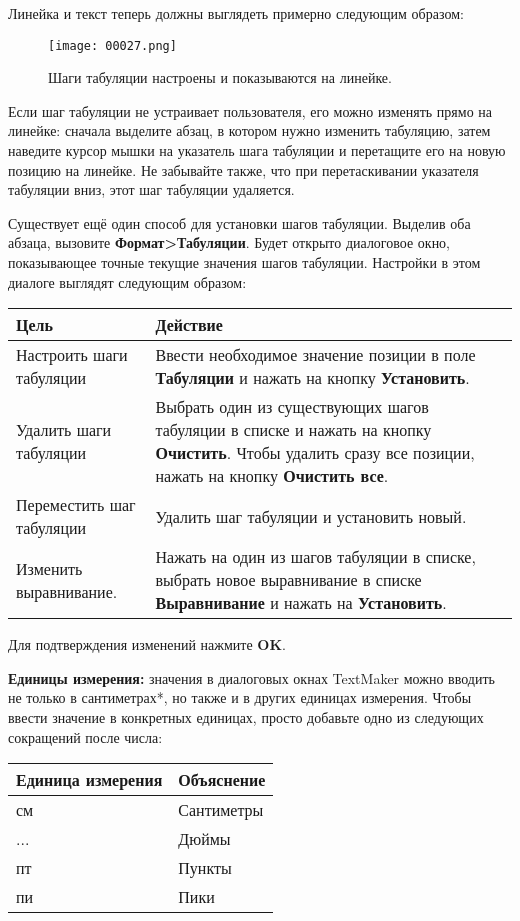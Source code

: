 \documentclass[a4paper,10pt]{article}
\begin{document}
Линейка и текст теперь должны выглядеть примерно следующим образом:

\begin{figure}[ht]
\texttt{[image: 00027.png]}
\centering
\caption{Шаги табуляции настроены и показываются на линейке.}
\end{figure}

Если шаг табуляции не устраивает пользователя, его можно изменять прямо на линейке: сначала выделите абзац, в котором нужно изменить табуляцию, затем наведите курсор мышки на указатель шага табуляции и перетащите его на новую позицию на линейке. Не забывайте также, что при перетаскивании указателя табуляции вниз, этот шаг табуляции удаляется.

Существует ещё один способ для установки шагов табуляции. Выделив оба абзаца, вызовите \textbf{Формат>Табуляции}. Будет открыто диалоговое окно, показывающее точные текущие значения шагов табуляции. Настройки в этом диалоге выглядят следующим образом:

\begin{center}
\begin{tabular}{ | m{6cm} | m{6cm} | }
\hline
 \textbf{Цель} & \textbf{Действие} \\ 
 \hline
 Настроить шаги табуляции & Ввести необходимое значение позиции в поле \textbf{Табуляции} и нажать на кнопку \textbf{Установить}.\\
\hline
Удалить шаги табуляции & Выбрать один из существующих шагов табуляции в списке и нажать на кнопку \textbf{Очистить}. Чтобы удалить сразу все позиции, нажать на кнопку \textbf{Очистить все}. \\
\hline
Переместить шаг табуляции & Удалить шаг табуляции и установить новый. \\
\hline
Изменить выравнивание. & Нажать на один из шагов табуляции в списке, выбрать новое выравнивание в списке \textbf{Выравнивание} и нажать на \textbf{Установить}.\\
\hline
\end{tabular}
\end{center}

Для подтверждения изменений нажмите \textbf{OK}.

\textbf{Единицы измерения:} значения в диалоговых окнах TextMaker можно вводить не только в сантиметрах*, но также и в других единицах измерения. Чтобы ввести значение в конкретных единицах, просто добавьте одно из следующих сокращений после числа:

\begin{center}
\begin{tabular}{ | m{4cm} | m{4cm} | }
\hline
 \textbf{Единица измерения} & \textbf{Объяснение} \\ 
 \hline
 см & Сантиметры\\
\hline
... & Дюймы\\
\hline
пт & Пункты \\
\hline
пи & Пики\\
\hline
\end{tabular}
\end{center}
\end{document}
